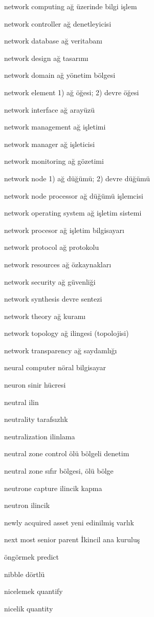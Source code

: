 \documentclass[12pt,fleqn]{article}\usepackage{../../common}
\begin{document}
network computing ağ üzerinde bilgi işlem

network controller ağ denetleyicisi

network database ağ veritabanı

network design ağ tasarımı

network domain ağ yönetim bölgesi

network element 1) ağ öğesi; 2) devre öğesi

network interface ağ arayüzü

network management ağ işletimi

network manager ağ işleticisi

network monitoring ağ gözetimi

network node 1) ağ düğümü; 2) devre düğümü

network node processor ağ düğümü işlemcisi

network operating system ağ işletim sistemi

network procesor ağ işletim bilgisayarı

network protocol ağ protokolu

network resources ağ özkaynakları

network security ağ güvenliği

network synthesis devre sentezi

network theory ağ kuramı

network topology ağ ilingesi (topolojisi)

network transparency ağ saydamlığı

neural computer nöral bilgisayar

neuron sinir hücresi

neutral ilin

neutrality tarafsızlık

neutralization ilinlama

neutral zone control ölü bölgeli denetim

neutral zone sıfır bölgesi, ölü bölge

neutrone capture ilincik kapma

neutron ilincik

newly acquired asset yeni edinilmiş varlık

next most senior parent İkincil ana kuruluş

öngörmek predict

nibble dörtlü

nicelemek quantify

nicelik quantity
\end{document}
